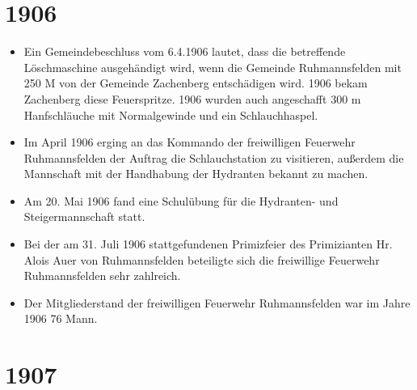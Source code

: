 \documentclass[12pt,a4paper]{book}
\begin{document}
\section*{1906}

\begin{itemize}
\item Ein Gemeindebeschluss vom 6.4.1906 lautet, dass die betreffende
Löschmaschine ausgehändigt wird, wenn die Gemeinde Ruhmannsfelden mit
250 M von der Gemeinde Zachenberg entschädigen wird. 1906 bekam
Zachenberg diese Feuerspritze. 1906 wurden auch angeschafft 300 m
Hanfschläuche mit Normalgewinde und ein Schlauchhaspel.

\item Im April 1906 erging an das Kommando der freiwilligen Feuerwehr
Ruhmannsfelden der Auftrag die Schlauchstation zu visitieren, außerdem
die Mannschaft mit der Handhabung der Hydranten bekannt zu machen.

\item Am 20. Mai 1906 fand eine Schulübung für die Hydranten- und
Steigermannschaft statt.

\item Bei der am 31. Juli 1906 stattgefundenen Primizfeier des
Primizianten Hr. Alois Auer von Ruhmannsfelden beteiligte sich die
freiwillige Feuerwehr Ruhmannsfelden sehr zahlreich.

\item Der Mitgliederstand der freiwilligen Feuerwehr Ruhmannsfelden war
im Jahre 1906 76 Mann.
\end{itemize}

\section*{1907}
\end{document}
